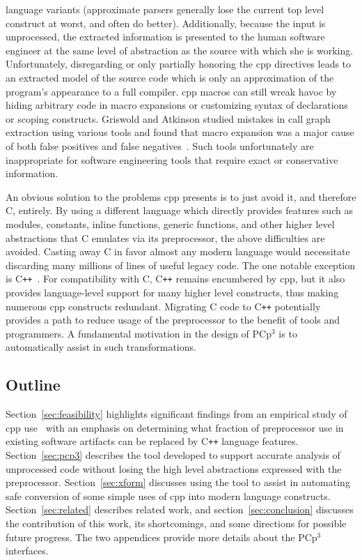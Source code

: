 \documentclass{article}
\newcommand{\pcp}{\mbox{\textsf{PCp}$^3$}}
\newcommand{\Cpp}{\mbox{\textsf{cpp}}}
\newcommand{\CPP}{\mbox{\textsf{C\texttt{++}}}}
\newcommand{\C}{\mbox{\textsf{C}}}
\begin{document}
language variants (approximate parsers generally lose the
current top level construct at worst, and often do better). Additionally,
because the input is unprocessed, the extracted information is presented
to the human software engineer at the same level of abstraction as the
source with which she is working.  Unfortunately, disregarding or
only partially honoring the \Cpp{} directives leads to an extracted model of
the source code which is only an approximation of the program's appearance
to a full compiler.  \Cpp{} macros can still wreak havoc by hiding
arbitrary code in macro expansions or customizing syntax of declarations
or scoping constructs.  Griswold and Atkinson studied mistakes in call
graph extraction using various tools and found that macro expansion was
a major cause of both false positives and false
negatives~\cite{Griswold96}.  Such tools unfortunately are inappropriate
for software engineering tools that require exact or conservative information.

An obvious solution to the problems \Cpp{} presents is to just avoid it,
and therefore \C{}, entirely.  By using a different language which
directly provides features such as modules, constants, inline functions,
generic functions, and other higher level abstractions that \C{}
emulates via its preprocessor, the above difficulties are avoided.
Casting away \C{} in favor almost any modern language would necessitate
discarding many millions of lines of useful legacy code.  The one notable
exception is \CPP{}~\cite{CD2DraftStandard}. For compatibility with
\C{}, \CPP{} remains encumbered by \Cpp{}, but it also provides
language-level support for many higher level constructs, thus making
numerous \Cpp{} constructs redundant.
Migrating \C{} code to \CPP{} potentially provides a path to reduce
usage of the preprocessor to the benefit of tools and programmers.  A
fundamental motivation in the design of \pcp{} is to automatically assist
in such transformations.

\subsection{Outline}

Section~\ref{sec:feasibility} highlights significant findings from an
empirical study of \Cpp{} use~\cite{EmpCpp} with an emphasis on
determining what fraction of preprocessor use in existing software
artifacts can be replaced by \CPP{} language features.
Section~\ref{sec:pcp3} describes the tool developed to
support accurate analysis of unprocessed code without losing the high
level abstractions expressed with the preprocessor.  
Section~\ref{sec:xform} discusses using the tool to assist in automating
safe conversion of some simple uses of \Cpp{} into modern language constructs.
Section~\ref{sec:related} describes related work, and
section~\ref{sec:conclusion} discusses the contribution of this work, its
shortcomings, and some directions for possible future progress. The two appendices
provide more details about the \pcp{} interfaces.
\end{document}
